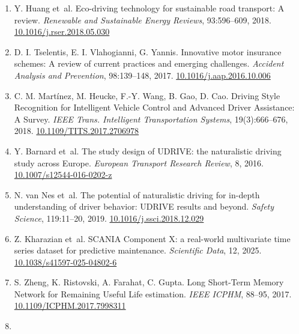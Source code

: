 \begin{enumerate}
  \label{r33}{T. A. Dingus et~al. Driver crash risk
  factors and prevalence evaluation using naturalistic driving data.
  \emph{PNAS}, 113(10):2636--2641, 2016.
  \href{https://doi.org/10.1073/pnas.1513271113}{10.1073/pnas.1513271113}}
\item
  \label{r34}{Y. Huang et~al. Eco-driving technology for
  sustainable road transport: A review. \emph{Renewable and Sustainable
  Energy Reviews}, 93:596--609, 2018.
  \href{https://doi.org/10.1016/j.rser.2018.05.030}{10.1016/j.rser.2018.05.030}}
\item
  \label{r35}{D. I. Tselentis, E. I. Vlahogianni, G.
  Yannis. Innovative motor insurance schemes: A review of current
  practices and emerging challenges. \emph{Accident Analysis and
  Prevention}, 98:139--148, 2017.
  \href{https://doi.org/10.1016/j.aap.2016.10.006}{10.1016/j.aap.2016.10.006}}
\item
  \label{r36}{C. M. Martínez, M. Heucke, F.-Y. Wang, B.
  Gao, D. Cao. Driving Style Recognition for Intelligent Vehicle Control
  and Advanced Driver Assistance: A Survey. \emph{IEEE Trans.
  Intelligent Transportation Systems}, 19(3):666--676, 2018.
  \href{https://doi.org/10.1109/TITS.2017.2706978}{10.1109/TITS.2017.2706978}}
\item
  \label{r37}{Y. Barnard et~al. The study design of
  UDRIVE: the naturalistic driving study across Europe. \emph{European
  Transport Research Review}, 8, 2016.
  \href{https://doi.org/10.1007/s12544-016-0202-z}{10.1007/s12544-016-0202-z}}
\item
  \label{r38}{N. van Nes et~al. The potential of
  naturalistic driving for in-depth understanding of driver behavior:
  UDRIVE results and beyond. \emph{Safety Science}, 119:11--20, 2019.
  \href{https://doi.org/10.1016/j.ssci.2018.12.029}{10.1016/j.ssci.2018.12.029}}
\item
  \label{r39}{Z. Kharazian et~al. SCANIA Component X: a
  real-world multivariate time series dataset for predictive
  maintenance. \emph{Scientific Data}, 12, 2025.
  \href{https://doi.org/10.1038/s41597-025-04802-6}{10.1038/s41597-025-04802-6}}
\item
  \label{r40}{S. Zheng, K. Ristovski, A. Farahat, C.
  Gupta. Long Short-Term Memory Network for Remaining Useful Life
  estimation. \emph{IEEE ICPHM}, 88--95, 2017.
  \href{https://doi.org/10.1109/ICPHM.2017.7998311}{10.1109/ICPHM.2017.7998311}}
\item

\end{enumerate}
